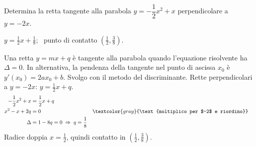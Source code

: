 
\begin{question}[ID=3.5, subtitle={Tangente perpendicolare a $y=-2x$ alla parabola (variante)}, difficulty=difficile, tags={parabola, tangente}]
Determina la retta tangente alla parabola $y = -\dfrac{1}{2}x^2 + x$ perpendicolare a $y = -2x$.
\begin{solution}
$y=\tfrac12x+\tfrac18$; \ punto di contatto $\left(\tfrac12,\tfrac38\right)$.
\end{solution}
\begin{explanation}
Una retta $y=mx+q$ è tangente alla parabola quando l'equazione risolvente ha $\Delta=0$. In alternativa, la pendenza della tangente nel punto di ascissa $x_0$ è $y'(x_0)=2ax_0+b$.
Svolgo con il metodo del discriminante. Rette perpendicolari a $y=-2x$: $y=\tfrac12x+q$.
\[\begin{aligned}
-\dfrac12x^2+x &= \dfrac12x+q\\
x^2-x+2q &= 0 && \textcolor{gray}{\text{moltiplico per $-2$ e riordino}}\\
\Delta &= 1-8q=0 \;\Rightarrow\; q=\dfrac18
\end{aligned}\]
Radice doppia $x=\tfrac12$, quindi contatto in $\left(\tfrac12,\tfrac38\right)$.
\end{explanation}
\end{question}


